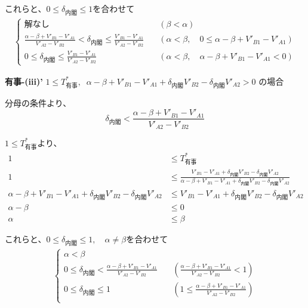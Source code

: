 \documentclass[main.tex]{subfiles}
\begin{document}
これらと、$0 \le \delta_{内閣} \le 1$を合わせて
\begin{align*}
\begin{cases}
    解なし   \quad &(\beta < \alpha) \\[1em]
    \frac{\alpha-\beta + V'_{B1}-V'_{A1}}{V'_{A2} - V'_{B2}} < \delta_{内閣} \le \frac{ V'_{B1} - V'_{A1} }{ V'_{A2} - V'_{B2} }  \quad &(\alpha < \beta, \quad 0 \le \alpha-\beta + V'_{B1}-V'_{A1}) \\[1em]
    0 \le \delta_{内閣} \le \frac{ V'_{B1} - V'_{A1} }{ V'_{A2} - V'_{B2} }  \quad &(\alpha < \beta, \quad \alpha-\beta + V'_{B1}-V'_{A1} < 0)
\end{cases}
\end{align*}




\bigskip
\textbf{有事-(iii)'}\; $1 \le T^*_{有事} ,\;\; \alpha-\beta + V'_{B1}-V'_{A1} + \delta_{内閣}V'_{B2} - \delta_{内閣}V'_{A2} > 0$ の場合

分母の条件より、
$$\delta_{内閣} < \frac{\alpha-\beta + V'_{B1}-V'_{A1}}{V'_{A2} - V'_{B2}} $$

$1 \le T^*_{有事}$より、
\begin{align*}
    1 &\le T^*_{有事}  \\
    1 &\le \frac{ V'_{B1} - V'_{A1} +\delta_{内閣}V'_{B2} - \delta_{内閣}V'_{A2} }{ \alpha-\beta + V'_{B1}-V'_{A1} + \delta_{内閣}V'_{B2} - \delta_{内閣}V'_{A2} }\\[1em]
    \alpha-\beta + V'_{B1}-V'_{A1} + \delta_{内閣}V'_{B2} - \delta_{内閣}V'_{A2}  &\le V'_{B1} - V'_{A1} +\delta_{内閣}V'_{B2} - \delta_{内閣}V'_{A2} \\[1em]
    \alpha - \beta &\le 0\\
    \alpha &\le \beta
\end{align*}


これらと、$0 \le \delta_{内閣} \le 1, \quad \alpha ≠ \beta$を合わせて
\begin{align*}
\begin{cases}
    \alpha < \beta \\[1em]
    0 \le \delta_{内閣} < \frac{\alpha-\beta + V'_{B1}-V'_{A1}}{V'_{A2} - V'_{B2}}  \quad &(\frac{\alpha-\beta + V'_{B1}-V'_{A1}}{V'_{A2} - V'_{B2}} < 1) \\[1em]
    0 \le \delta_{内閣} \le 1  \quad &(1 \le \frac{\alpha-\beta + V'_{B1}-V'_{A1}}{V'_{A2} - V'_{B2}}) \\[1em]
\end{cases}
\end{align*}
\end{document}

